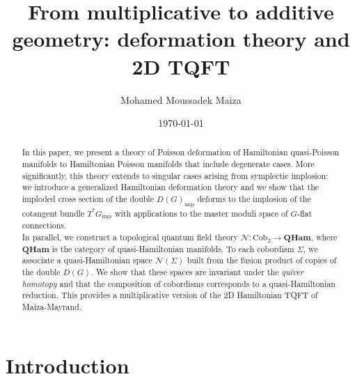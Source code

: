 \documentclass[reqno]{amsart}
\title{From multiplicative to additive geometry: deformation theory and 2D TQFT}
\date{\today}
\author{Mohamed Moussadek Maiza}
\theoremstyle{plain}
\theoremstyle{definition}
\newcommand{\N}{\mathcal{N}}
\newcommand{\imp}{\text{imp}}
\begin{document}
\maketitle

\begin{abstract}
In this paper, we present a theory of Poisson deformation of Hamiltonian quasi-Poisson manifolds to Hamiltonian Poisson manifolds that include degenerate cases. More significantly, this theory extends to singular cases arising from symplectic implosion: we introduce a generalized Hamiltonian deformation theory and we show that the imploded cross section of the double $D(G)_\imp$ deforms to the implosion of the cotangent bundle $T^*G_\imp$ with applications to the master moduli space of $G$-flat connections.\\
In parallel, we construct a topological quantum field theory $\N: \text{Cob}_{2}\to \mathbf{QHam}$, where $\mathbf{QHam}$ is the category of quasi-Hamiltonian manifolds. To each cobordism $\Sigma$, we associate a quasi-Hamiltonian space $\N(\Sigma)$ built from the fusion product of copies of the double $D(G).$ We show that these spaces are invariant under the \emph{quiver homotopy} and that the composition of cobordisms corresponds to a quasi-Hamiltonian reduction. This provides a multiplicative version of the 2D Hamiltonian TQFT of Maiza-Mayrand.
\end{abstract}

\section{Introduction}
\end{document}
